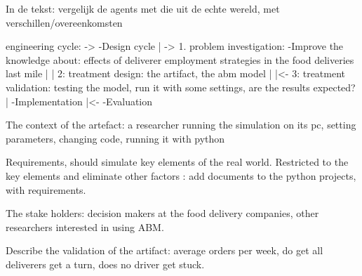 In de tekst:
vergelijk de agents met die uit de echte wereld, met verschillen/overeenkomsten

engineering cycle:
->  -Design cycle
|     ->    1. problem investigation: -Improve the knowledge about: effects of deliverer employment strategies in the food deliveries last mile
|     |     2: treatment design: the artifact, the abm model
|     |<-   3: treatment validation: testing the model, run it with some settings, are the results expected?
|   -Implementation
|<- -Evaluation

The context of the artefact: a researcher running the simulation on its pc, setting parameters, changing code, running it with python

Requirements, should simulate key elements of the real world.
Restricted to the key elements and eliminate other factors
\todo: add documents to the python projects, with requirements.

The stake holders: decision makers at the food delivery companies, other researchers interested in using ABM.

Describe the validation of the artifact: average orders per week, do get all deliverers get a turn, does no driver get stuck.

